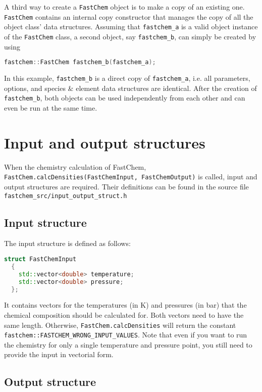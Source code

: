 \documentclass[numbers=noenddot]{aux/fcmanual}
\newcommand{\fc}{\texttt{FastChem}\xspace}
\begin{document}
\bigbreak

A third way to create a \fc object is to make a copy of an existing one. \fc contains an internal copy constructor that manages the copy of all the object class' data structures. Assuming that \lstinline!fastchem_a! is a valid object instance of the \fc class, a second object, say \lstinline!fastchem_b!, can simply be created by using 
\begin{lstlisting}[language=C++]
  fastchem::FastChem fastchem_b(fastchem_a);
\end{lstlisting}

In this example, \lstinline!fastchem_b! is a direct copy of \lstinline!fastchem_a!, i.e. all parameters, options, and species \& element data structures are identical. After the creation of \lstinline!fastchem_b!, both objects can be used independently from each other and can even be run at the same time. 



\section{Input and output structures}

When the chemistry calculation of FastChem, \lstinline!FastChem.calcDensities(FastChemInput, FastChemOutput)! is called, input and output structures are required. Their definitions can be found in the source file \verb|fastchem_src/input_output_struct.h|

\subsection{Input structure}
\label{sec:fastchem_input_struct}
The input structure is defined as follows:
\begin{lstlisting}[language=C++]
  struct FastChemInput
  {
    std::vector<double> temperature; 
    std::vector<double> pressure;
  };
\end{lstlisting}

It contains vectors for the temperatures (in K) and pressures (in bar) that the chemical composition should be calculated for. Both vectors need to have the same length. Otherwise, \lstinline!FastChem.calcDensities! will return the constant \lstinline!fastchem::FASTCHEM_WRONG_INPUT_VALUES!. Note that even if you want to run the chemistry for only a single temperature and pressure point, you still need to provide the input in vectorial form.


\subsection{Output structure}
\end{document}
